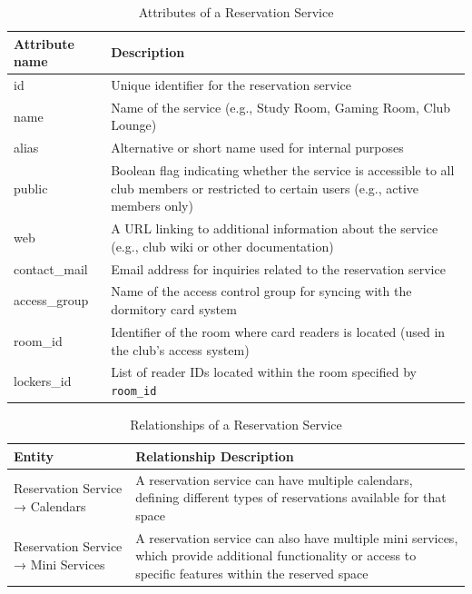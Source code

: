 \begin{table}[H]
  \centering
  \begin{tabularx}{\textwidth}{|l|X|}
  \hline
  \textbf{Attribute name} & \textbf{Description} \\
  \hline
  id & Unique identifier for the reservation service \\
  \hline
  name & Name of the service (e.g., Study Room, Gaming Room, Club Lounge) \\
  \hline
  alias & Alternative or short name used for internal purposes \\
  \hline
  public & Boolean flag indicating whether the service is accessible to all club members or restricted to certain users (e.g., active members only) \\
  \hline
  web & A URL linking to additional information about the service (e.g., club wiki or other documentation) \\
  \hline
  contact\_mail & Email address for inquiries related to the reservation service \\
  \hline
  access\_group & Name of the access control group for syncing with the dormitory card system \\
  \hline
  room\_id & Identifier of the room where card readers is located (used in the club's access system) \\
  \hline
  lockers\_id & List of reader IDs located within the room specified by \texttt{room\_id} \\
  \hline
  \end{tabularx}
  \caption{Attributes of a Reservation Service}
  \label{tab:reservation-service-attributes}
  \end{table}

  \begin{table}[H]
    \centering
    \begin{tabularx}{\textwidth}{|l|X|}
    \hline
    \textbf{Entity} & \textbf{Relationship Description} \\
    \hline
    Reservation Service → Calendars & A reservation service can have multiple calendars, defining different types of reservations available for that space \\
    \hline
    Reservation Service → Mini Services & A reservation service can also have multiple mini services, which provide additional functionality or access to specific features within the reserved space \\
    \hline
    \end{tabularx}
    \caption{Relationships of a Reservation Service}
    \label{tab:reservation-service-relationships}
    \end{table}

